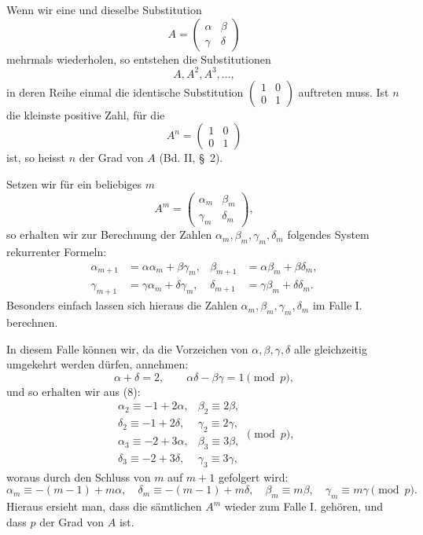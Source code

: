 \documentclass[11pt]{article}
\begin{document}
Wenn wir eine und dieselbe Substitution
\begin{equation}
 A=\begin{pmatrix}\alpha&\beta\\ \gamma&\delta\end{pmatrix}
\tag{7}
\end{equation}
mehrmals wiederholen, so entstehen die Substitutionen
\[
 A,A^2,A^3,\ldots,
\]
in deren Reihe einmal die identische Substitution $\begin{pmatrix}1&0\\0&1\end{pmatrix}$ auftreten muss. Ist $n$ die kleinste positive Zahl, für die
\[
 A^n=\begin{pmatrix}1&0\\0&1\end{pmatrix}
\]
ist, so heisst $n$ der Grad von $A$ (Bd. II, \S~2).

Setzen wir für ein beliebiges $m$
\[
 A^m=\begin{pmatrix}\alpha_m&\beta_m\\\gamma_m&\delta_m\end{pmatrix},
\]
so erhalten wir zur Berechnung der Zahlen $\alpha_m,\beta_m,\gamma_m,\delta_m$ folgendes System rekurrenter Formeln:
\begin{equation}
\begin{aligned}
 \alpha_{m+1}&=\alpha\alpha_m+\beta\gamma_m,&
 \beta_{m+1}&=\alpha\beta_m+\beta\delta_m,\\
 \gamma_{m+1}&=\gamma\alpha_m+\delta\gamma_m,&
 \delta_{m+1}&=\gamma\beta_m+\delta\delta_m.
\end{aligned}
\tag{8}
\end{equation}
Besonders einfach lassen sich hieraus die Zahlen $\alpha_m,\beta_m,\gamma_m,\delta_m$ im Falle I. berechnen.

In diesem Falle können wir, da die Vorzeichen von $\alpha,\beta,\gamma,\delta$ alle gleichzeitig umgekehrt werden dürfen, annehmen:
\[
 \alpha+
\delta=2,
 \qquad \alpha\delta-\beta\gamma=1\pmod p,
\]
und so erhalten wir aus (8):
\[
\begin{array}{ll}
\alpha_2\equiv -1+2\alpha,&\beta_2\equiv2\beta,\\
\delta_2\equiv -1+2\delta,&\gamma_2\equiv2\gamma,\\
\alpha_3\equiv -2+3\alpha,&\beta_3\equiv3\beta,\\
\delta_3\equiv -2+3\delta,&\gamma_3\equiv3\gamma,
\end{array}\pmod p,
\]
woraus durch den Schluss von $m$ auf $m+1$ gefolgert wird:
\begin{equation}
 \alpha_m\equiv-(m-1)+m\alpha,
 \quad \delta_m\equiv-(m-1)+m\delta,
 \quad \beta_m\equiv m\beta,
 \quad \gamma_m\equiv m\gamma\pmod p.
\tag{9}
\end{equation}
Hieraus ersieht man, dass die sämtlichen $A^m$ wieder zum Falle I. gehören, und dass $p$ der Grad von $A$ ist.
\end{document}
